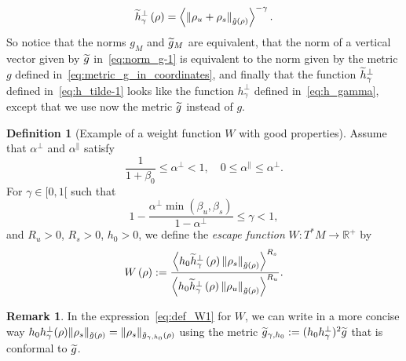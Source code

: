 \documentclass[10pt]{amsart}
\theoremstyle{definition}\newtheorem{defi}[theo]{Definition}\newtheorem{rema}[theo]{Remark}\newtheorem{exam}[theo]{Example}\newtheorem{exem}[theo]{Example}\newtheorem{nota}[theo]{Notation}
\newcommand{\bbR}{\mathbb{R}}
\let\oldtilde\tilde
\renewcommand*{\tilde}[1]{\mathchoice{\widetilde{#1}}{\widetilde{#1}}{\oldtilde{#1}}{\oldtilde{#1}}}
\begin{document}
\begin{equation}\label{eq:h_tilde-1}
\tilde{h}_{\gamma}^{\perp}\left(\rho\right)=\left\langle \left\Vert \rho_{u}+\rho_{s}\right\Vert _{\tilde{g}\left(\rho\right)}\right\rangle ^{-\gamma}.
\end{equation}
So notice that the norms $g_{M}$ and $\tilde{g}_{M}$ are equivalent, that the norm of a vertical vector given by $\tilde{g}$ in~\eqref{eq:norm_g-1} is equivalent to the norm given by the metric $g$ defined in~\eqref{eq:metric_g_in_coordinates}, and finally that the function $\tilde{h}_{\gamma}^{\perp}$ defined in~\eqref{eq:h_tilde-1} looks like the function $h_{\gamma}^{\perp}$ defined in~\eqref{eq:h_gamma}, except that we use now the metric $\tilde{g}$ instead of $g$.

\begin{cBoxA}{}
\begin{defi}[Example of a weight function $W$ with good properties]\label{def:def_W1}
Assume that $\alpha^{\perp}$ and $\alpha^{\parallel}$ satisfy
\begin{equation}\label{eq:ineq1}
\frac{1}{1+\beta_{0}}\leq\alpha^{\perp}<1,\quad0\leq\alpha^{\parallel}\leq\alpha^{\perp}.
\end{equation}
For $\gamma\in[0,1[$ such that
\begin{equation}\label{eq:gamma_interval}
1-\frac{\alpha^{\perp}\min\left(\beta_{u},\beta_{s}\right)}{1-\alpha^{\perp}}\leq\gamma<1,
\end{equation}
and $R_{u}>0$, $R_{s}>0$, $h_{0}>0$, we define the \emph{escape function} $W:T^{*}M\rightarrow\bbR^{+}$ by
\begin{equation}\label{eq:def_W1}
W\left(\rho\right):=\frac{\left\langle h_{0}\tilde{h}_{\gamma}^{\perp}\left(\rho\right)\left\Vert \rho_{s}\right\Vert _{\tilde{g}\left(\rho\right)}\right\rangle ^{R_{s}}}{\left\langle h_{0}\tilde{h}_{\gamma}^{\perp}\left(\rho\right)\left\Vert \rho_{u}\right\Vert _{\tilde{g}\left(\rho\right)}\right\rangle ^{R_{u}}}.
\end{equation}
\end{defi}
\end{cBoxA}

\begin{rema}
In the expression~\eqref{eq:def_W1} for $W$, we can write in a more concise way $h_{0}h_{\gamma}^{\perp}(\rho)\Vert \rho_{s}\Vert _{\tilde{g}(\rho)}=\Vert \rho_{s}\Vert _{\tilde{g}_{\gamma,h_{0}}(\rho)}$ using the metric $\tilde{g}_{\gamma,h_{0}}:=(h_{0}h_{\gamma}^{\perp})^{2}\tilde{g}$ that is conformal to $\tilde{g}$.
\end{rema}
\end{document}

